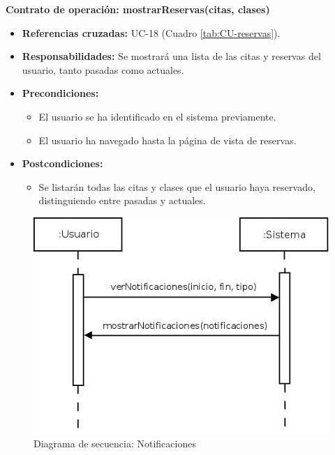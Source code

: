 \textbf{Contrato de operación: mostrarReservas(citas, clases)}
\begin{itemize}
\item \textbf{Referencias cruzadas:} UC-18 (Cuadro \ref{tab:CU-reservas}).
\item \textbf{Responsabilidades:} Se mostrará una lista de las citas y reservas del usuario, tanto pasadas como actuales.
\item \textbf{Precondiciones:} 
 \begin{itemize}
\item El usuario se ha identificado en el sistema previamente.
\item El usuario ha navegado hasta la página de vista de reservas.
\end {itemize}
\item \textbf{Postcondiciones:} 
 \begin{itemize}
\item Se listarán todas las citas y clases que el usuario haya reservado, distinguiendo entre pasadas y actuales.
\end {itemize}
\end {itemize}


\vspace{10mm}

\begin{figure}[H]
\centering
  \includegraphics[scale=.55]{img/secuencias/notificaciones.jpeg}
  \caption{Diagrama de secuencia: Notificaciones}
  \label{fig:secuencia-notificaciones}
\end{figure}

